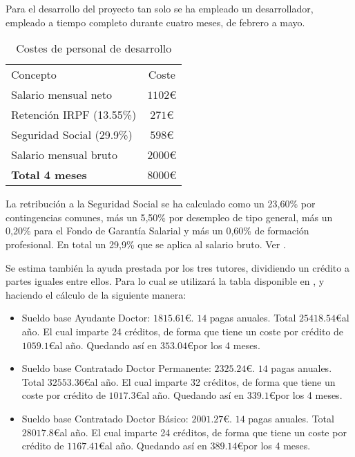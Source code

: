 Para el desarrollo del proyecto tan solo se ha empleado un desarrollador, empleado a tiempo completo durante cuatro meses, de febrero a mayo.

\begin{table}
	\begin{center}
		\begin{tabular}{l  c}\hline
			\toprule
			Concepto & Coste\\
			\otoprule
			Salario mensual neto & $1102 $\euro\\
			Retención IRPF (13.55\%)  & $271 $\euro\\
			Seguridad Social (29.9\%)& $598 $\euro\\
			Salario mensual bruto & $2000 $\euro\\
			\hline
			\textbf{Total 4 meses} & $8000 $\euro\\
			\bottomrule
		\end{tabular}
		\caption{Costes de personal de desarrollo}
		\label{tb:costesPersonal}
	\end{center}
\end{table}

La retribución a la Seguridad Social se ha calculado como un 23,60\% por contingencias comunes, más un 5,50\% por desempleo de tipo general, más un 0,20\% para el Fondo de Garantía Salarial y más un 0,60\% de formación profesional. En total un 29,9\% que se aplica al salario bruto. Ver \citep{wiki:basesCot18}.

Se estima también la ayuda prestada por los tres tutores, dividiendo un crédito a partes iguales entre ellos. Para lo cual se utilizará la tabla disponible en \citep{wiki:ubupdiwages}, y haciendo el cálculo de la siguiente manera: 

\begin{itemize}
\item Sueldo base Ayudante Doctor: $1815.61$\euro. $14$ pagas anuales. Total $25418.54$\euro  al año. El cual imparte 24 créditos, de forma que tiene un coste por crédito de $1059.1$\euro  al año. Quedando así en $353.04$\euro por los 4 meses.
\item Sueldo base Contratado Doctor Permanente: $2325.24$\euro. $14$ pagas anuales. Total $32553.36$\euro   al año. El cual imparte 32 créditos, de forma que tiene un coste por crédito de $1017.3$\euro  al año. Quedando así en $339.1$\euro por los 4 meses.
\item Sueldo base Contratado Doctor Básico: $2001.27$\euro. $14$ pagas anuales. Total $28017.8$\euro  al año. El cual imparte 24 créditos, de forma que tiene un coste por crédito de $1167.41$\euro  al año. Quedando así en $389.14$\euro por los 4 meses.
\end{itemize}


